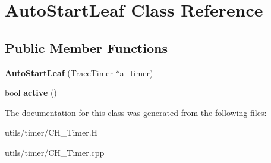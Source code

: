 \hypertarget{class_auto_start_leaf}{}\section{Auto\+Start\+Leaf Class Reference}
\label{class_auto_start_leaf}
\subsection*{Public Member Functions}
\begin{DoxyCompactItemize}
\item 
\mbox{\label{class_auto_start_leaf_ad31126dbec37c0245fd08bb77be1612b}} 
{\bfseries Auto\+Start\+Leaf} (\hyperlink{class_trace_timer}{Trace\+Timer} $\ast$a\+\_\+timer)
\item 
\mbox{\label{class_auto_start_leaf_ac6ebea5f14cfea49095514d89f107691}} 
bool {\bfseries active} ()
\end{DoxyCompactItemize}


The documentation for this class was generated from the following files\+:\begin{DoxyCompactItemize}
\item 
utils/timer/C\+H\+\_\+\+Timer.\+H\item 
utils/timer/C\+H\+\_\+\+Timer.\+cpp\end{DoxyCompactItemize}
